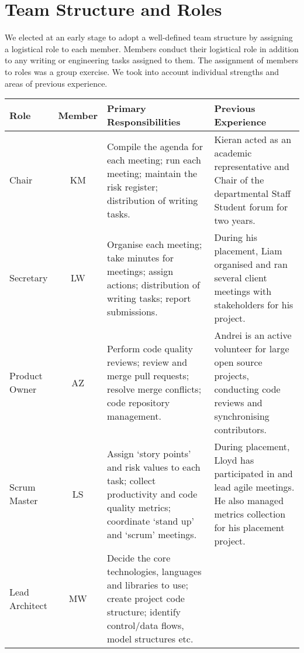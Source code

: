     \section{Team Structure and Roles}
    \label{team_structure}
    
    We elected at an early stage to adopt a well-defined team structure by assigning a logistical role to each member. Members conduct their logistical role in addition to any writing or engineering tasks assigned to them. The assignment of members to roles was a group exercise. We took into account individual strengths and areas of previous experience.

        \begin{table*}[h!]
        \small\begin{tabularx}{\textwidth}{|p{1.6cm}|c|Y|Y|}
        \hline
            \textbf{Role} & \textbf{Member} & \textbf{Primary Responsibilities} & \textbf{Previous Experience} \\
        \hline
        Chair & 
        KM & 
        Compile the agenda for each meeting; run each meeting; maintain the risk register; distribution of writing tasks. &
        Kieran acted as an academic representative and Chair of the departmental Staff Student forum for two years. \\
        \hline
        Secretary & 
        LW & 
        Organise each meeting; take minutes for meetings; assign actions; distribution of writing tasks; report submissions. & 
        During his placement, Liam organised and ran several client meetings with stakeholders for his project. \\
        \hline
        Product Owner & 
        AZ & 
        Perform code quality reviews; review and merge pull requests; resolve merge conflicts; code repository management. & 
        Andrei is an active volunteer for large open source projects, conducting code reviews and synchronising contributors. \\
        \hline
        Scrum Master & 
        LS & 
        Assign `story points' and risk values to each task; collect productivity and code quality metrics; coordinate `stand up' and `scrum' meetings. & 
        During placement, Lloyd has participated in and lead agile meetings. He also managed metrics collection for his placement project. \\
        \hline
        Lead \phantom{11} Architect & 
        MW & 
        Decide the core technologies, languages and libraries to use; create project code structure; identify control/data flows, model structures etc. & 

\end{tabularx}
\end{table*}
